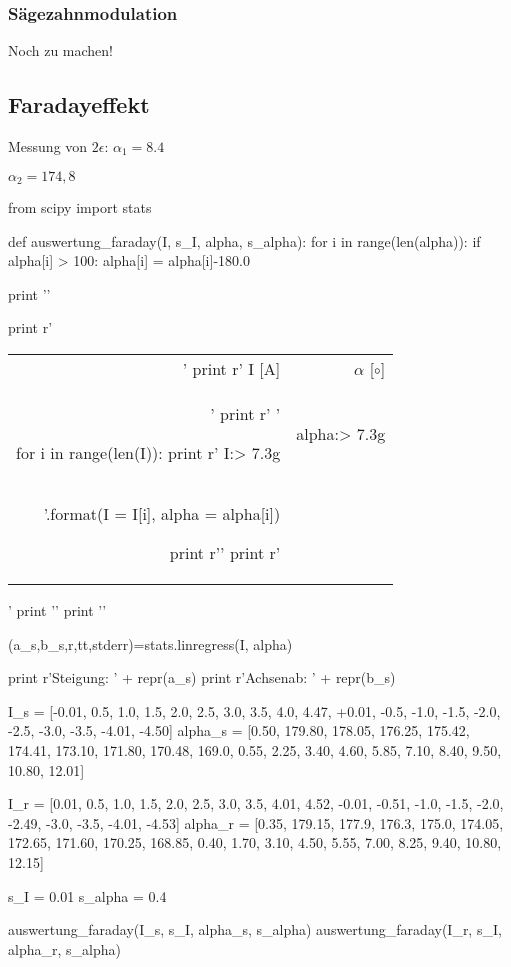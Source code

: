 \subsubsection{Sägezahnmodulation}

Noch zu machen!


\subsection{Faradayeffekt}

Messung von $2\epsilon$:
$\alpha_1 = 8.4$

$\alpha_2 = 174,8$

\begin{python}
from scipy import stats

def auswertung_faraday(I, s_I, alpha, s_alpha):
  for i in range(len(alpha)):
    if alpha[i] > 100:
      alpha[i] = alpha[i]-180.0

  print '\n'

  print r'\begin{tabular}{rr} \toprule'
  print r' I [A] & $\alpha$ [$\circ$] \\'
  print r' \midrule '

  for i in range(len(I)):
    print r' {I:> 7.3g}  &  {alpha:> 7.3g} \\ '.format(I = I[i], alpha = alpha[i])

  print r'\bottomrule '
  print r'\end{tabular}'
  print '\n'
  print '\n'

  (a_s,b_s,r,tt,stderr)=stats.linregress(I, alpha)

  print r'Steigung: ' + repr(a_s)
  print r'Achsenab: ' + repr(b_s)


I_s = [-0.01, 0.5, 1.0, 1.5, 2.0, 2.5, 3.0, 3.5, 4.0, 4.47, +0.01, -0.5, -1.0, -1.5, -2.0, -2.5, -3.0, -3.5, -4.01, -4.50]
alpha_s = [0.50, 179.80, 178.05, 176.25, 175.42, 174.41, 173.10, 171.80, 170.48, 169.0, 0.55, 2.25, 3.40, 4.60, 5.85, 7.10, 8.40, 9.50, 10.80, 12.01]

I_r = [0.01, 0.5, 1.0, 1.5, 2.0, 2.5, 3.0, 3.5, 4.01, 4.52, -0.01, -0.51, -1.0, -1.5, -2.0, -2.49, -3.0, -3.5, -4.01, -4.53]
alpha_r = [0.35, 179.15, 177.9, 176.3, 175.0, 174.05, 172.65, 171.60, 170.25, 168.85, 0.40, 1.70, 3.10, 4.50, 5.55, 7.00, 8.25, 9.40, 10.80, 12.15]

s_I = 0.01
s_alpha = 0.4

auswertung_faraday(I_s, s_I, alpha_s, s_alpha)
auswertung_faraday(I_r, s_I, alpha_r, s_alpha)

\end{python}
